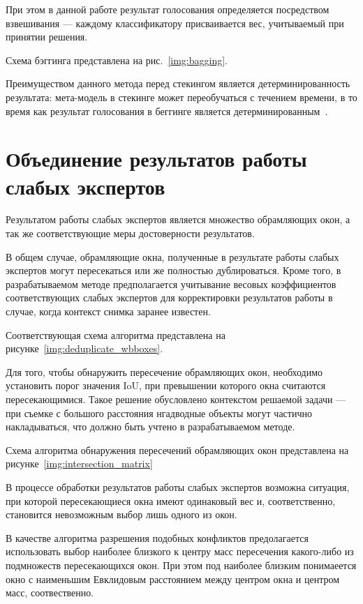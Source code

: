 При этом в данной работе результат голосования определяется посредством взвешивания --- каждому классификатору присваивается вес, учитываемый при принятии решения.

Схема бэггинга представлена на рис.~\ref{img:bagging}.


Преимуществом данного метода перед стекингом является детерминированность результата: мета-модель в стекинге может переобучаться с течением времени, в то время как результат голосования в беггинге является детерминированным~\cite{ensembles}.

\section{Объединение результатов работы слабых экспертов}

Результатом работы слабых экспертов является множество обрамляющих окон, а так же соответствующие меры достоверности результатов.

В общем случае, обрамляющие окна, полученные в результате работы слабых экспертов могут пересекаться или же полностью дублироваться. Кроме того, в разрабатываемом методе предполагается учитывание весовых коэффициентов соответствующих слабых экспертов для корректировки результатов работы в случае, когда контекст снимка заранее известен.

Соответствующая схема алгоритма представлена на рисунке~\ref{img:deduplicate_wbboxes}.

Для того, чтобы обнаружить пересечение обрамляющих окон, необходимо установить порог значения IoU, при превышении которого окна считаются пересекающимися. Такое решение обусловлено контекстом решаемой задачи --- при съемке с большого расстояния нгадводные объекты могут частично накладываться, что должно быть учтено в разрабатываемом методе.

Схема алгоритма обнаружения пересечений обрамляющих окон представлена на рисунке~\ref{img:intersection_matrix}

В процессе обработки результатов работы слабых экспертов возможна ситуация, при которой пересекающиеся окна имеют одинаковый вес и, соответственно, становится невозможным выбор лишь одного из окон. 

В качестве алгоритма разрешения подобных конфликтов предолагается использовать выбор наиболее близкого к центру масс пересечения какого-либо из подмножеств пересекающихся окон. При этом под наиболее близким понимаеется окно с наименьшим Евклидовым расстоянием между центром окна и центром масс, соотвественно.

